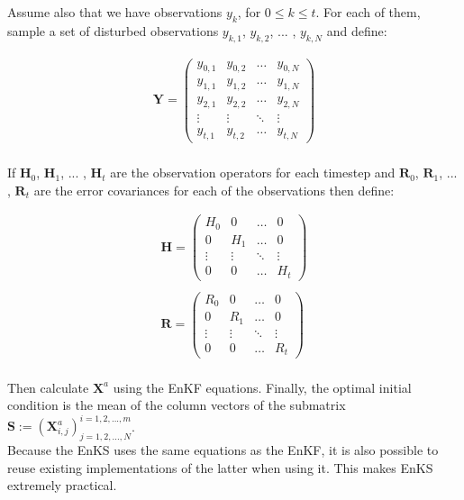 \documentclass{article}
\begin{document}
Assume also that we have observations $y_k$, for $0 \leq k \leq t$. For each of them, sample a set of disturbed observations $y_{k, 1}$, $y_{k, 2}$, ... , $y_{k, N}$ and define:

\begin{gather*}
\mathbf{Y} =
\begin{pmatrix}
y_{0, 1} & y_{0, 2} & \dots & y_{0, N} \\
y_{1, 1} & y_{1, 2} & \dots & y_{1, N} \\
y_{2, 1} & y_{2, 2} & \dots & y_{2, N} \\
\vdots & \vdots & \ddots & \vdots \\
y_{t, 1} & y_{t, 2} & \dots & y_{t, N}
\end{pmatrix} \\
\end{gather*}

If $\mathbf{H}_0$, $\mathbf{H}_1$, ... , $\mathbf{H}_t$ are the observation operators for each timestep and $\mathbf{R}_0$, $\mathbf{R}_1$, ... , $\mathbf{R}_t$ are the error covariances for each of the observations then define:

\begin{gather*}
\mathbf{H} =
\begin{pmatrix}
H_0 & 0 & \dots & 0 \\
0 & H_1 & \dots & 0 \\
\vdots & \vdots & \ddots & \vdots \\
0 & 0 & \dots & H_t
\end{pmatrix} \\
\\
\mathbf{R} =
\begin{pmatrix}
R_0 & 0 & \dots & 0 \\
0 & R_1 & \dots & 0 \\
\vdots & \vdots & \ddots & \vdots \\
0 & 0 & \dots & R_t
\end{pmatrix} \\
\end{gather*}

Then calculate $\mathbf{X}^a$ using the EnKF equations. Finally, the optimal initial condition is the mean of the column vectors of the submatrix $\mathbf{S} := (\mathbf{X}_{i, j}^a)_{j = 1, 2, ... , N}^{i = 1, 2, ... , m}$. \\

Because the EnKS uses the same equations as the EnKF, it is also possible to reuse existing implementations of the latter when using it. This makes EnKS extremely practical. \\
\end{document}
